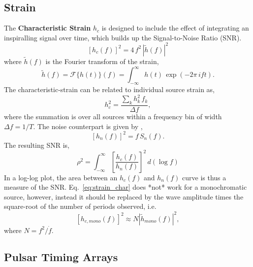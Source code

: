 \documentclass[10pt, oneside, onecolumn]{article}   	%
\begin{document}
        \subsection{Strain}
        The \textbf{Characteristic Strain} $h_c$ is designed to include the effect of integrating an inspiralling signal over time, which builds up the Signal-to-Noise Ratio (SNR).
        \begin{equation}
        \label{eq:strain_char}
        \left[h_c(f)\right]^2 = 4 \, f^2\, \left| \tilde{h}(f)\right|^2
        \end{equation}
        where $\tilde{h}(f)$ is the Fourier transform of the strain,
        \begin{equation}
        \tilde{h}(f) = \mathcal{F}\{ h(t) \}(f) = \int_{-\infty}^\infty h(t) \,  \exp\left(-2\pi \, i f t\right).
        \end{equation}
        The characteristic-strain can be related to individual source strain as,
        \begin{equation}
        h_c^2 = \frac{\sum_k h_k^2 \, f_k}{\Delta f},
        \end{equation}
        where the summation is over all sources within a frequency bin of width $\Delta f = 1/T$.
        The noise counterpart is given by \citep{moore2015},
        \begin{equation}
        \left[h_n(f)\right]^2 = f \, S_n(f).
        \end{equation}
        The resulting SNR is,
        \begin{equation}
        \rho^2 = \int_{-\infty}^{\infty} \left[ \frac{h_c(f)}{h_n(f)} \right]^2 \, d\left(\log f\right)
        \end{equation}
        In a log-log plot, the area between an $h_c(f)$ and $h_n(f)$ curve is thus a measure of the SNR.  Eq.~\ref{eq:strain_char} does *not* work for a monochromatic source, however, instead it should be replaced by the wave amplitude times the square-root of the number of periods observed, i.e.
        \begin{equation}
        \left[h_{c,mono}(f)\right]^2 \approx N \left|\tilde{h}_{mono}(f)\right|^2,
        \end{equation}
        where $N = f^2 / \dot{f}$.

        \subsection{Pulsar Timing Arrays}
\end{document}
